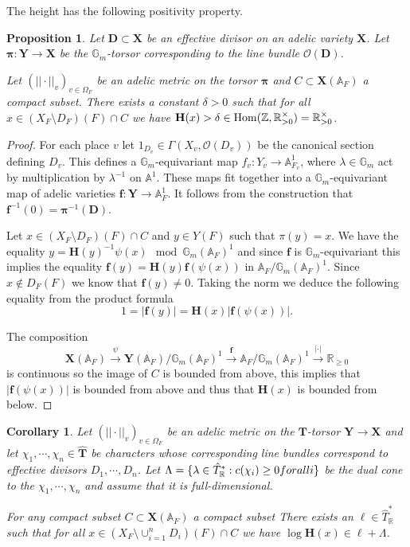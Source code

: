 \documentclass[a4paper,11pt,reqno]{amsart}
\newcommand{\R}{\mathbb{R}}
\newcommand{\G}{\mathbb{G}}
\newcommand{\A}{\mathbb{A}}
\DeclareMathOperator{\Hom}{Hom}
\newtheorem{proposition}[theorem]{Proposition}
\newtheorem{corollary}[theorem]{Corollary}
\theoremstyle{definition}
\begin{document}
The height has the following positivity property.
\begin{proposition}
	Let $\mathbf{D} \subset \mathbf{X}$ be an effective divisor on an adelic variety $\mathbf{X}$. Let $\bm{\pi}: \mathbf{Y} \to \mathbf{X}$ be the $\G_m$-torsor corresponding to the line bundle $\mathcal{O}(\mathbf{D})$.
	
	Let $(||\cdot||_v)_{v \in \Omega_F}$ be an adelic metric on the torsor $\bm{\pi}$ and $C \subset \mathbf{X}(\A_F)$ a compact subset. There exists a constant $\delta > 0$ such that for all $x \in (X_F \setminus D_F)(F) \cap C$ we have $\mathbf{H}(x) > \delta \in \Hom(\Z, \R_{>0}^{\times}) = \R_{>0}^{\times}$.
	\label{Height is bounded below}
\end{proposition}
\begin{proof}
	For each place $v$ let $1_{D_v} \in \Gamma(X_v,\mathcal{O}(D_v))$ be the canonical section defining $D_v$. This defines a $\G_m$-equivariant map $f_v: Y_v \to \A_{F_v}^1$, where $\lambda \in \G_m$ act by multiplication by $\lambda^{-1}$ on $\A^1$. These maps fit together into a $\G_m$-equivariant map of adelic varieties $\mathbf{f}: \mathbf{Y} \to \A_F^1$. It follows from the construction that $\mathbf{f}^{-1}(0) = \bm{\pi}^{-1}(\mathbf{D})$.
	
	Let $x \in (X_F \setminus D_F)(F) \cap C$ and $y \in Y(F)$ such that $\pi(y) = x$. We have the equality $y = \mathbf{H}(y)^{-1} \psi(x) \mod \G_m(\A_F)^1$ and since $\mathbf{f}$ is $\G_m$-equivariant this implies the equality $\mathbf{f}(y) = \mathbf{H}(y) \mathbf{f}(\psi(x))$ in $\A_F/\G_m(\A_F)^1$. Since $x \not \in D_F(F)$ we know that $\mathbf{f}(y) \neq 0$. Taking the norm we deduce the following equality from the product formula
	\begin{equation*}
		1 = |\mathbf{f}(y)| = \mathbf{H}(x) |\mathbf{f}(\psi(x))|.
	\end{equation*}
	
	The composition 
	\begin{equation*}
		\mathbf{X}(\A_F) \xrightarrow{\psi} \mathbf{Y}(\A_F)/\G_m(\A_{F})^1 \xrightarrow{\mathbf{f}} \A_F/\G_m(\A_{F})^1 \xrightarrow{|\cdot|} \R_{\geq 0}
	\end{equation*}
	is continuous so the image of $C$ is bounded from above, this implies that $|\mathbf{f}(\psi(x))|$ is bounded from above and thus that $\mathbf{H}(x)$ is bounded from below.
\end{proof}
\begin{corollary}
	Let $(||\cdot||_v)_{v \in \Omega_F}$ be an adelic metric on the $\mathbf{T}$-torsor $\mathbf{Y} \to \mathbf{X}$ and let $\chi_1, \cdots, \chi_n \in \hat{\mathbf{T}}$ be characters whose corresponding line bundles correspond to effective divisors $D_1, \cdots, D_n$. Let $\Lambda = \{\lambda \in \hat{T}^{*}_{\R}: c(\chi_i) \geq 0 \emph{ for all } i\}$ be the dual cone to the $\chi_1, \cdots, \chi_n$ and assume that it is full-dimensional.
	
	For any compact subset $C \subset \mathbf{X}(\A_F)$ a compact subset There exists an $\ell \in \hat{T}^{*}_{\R}$ such that for all $x \in (X_F \setminus \cup_{i = 1}^n D_i)(F) \cap C$ we have $\log \mathbf{H}(x) \in \ell + \Lambda$.
	\label{Height lies in shift in effective cone}
\end{corollary}
\end{document}
